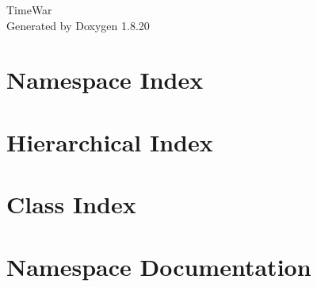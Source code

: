\let\mypdfximage\pdfximage\def\pdfximage{\immediate\mypdfximage}\documentclass[twoside]{book}
\newcommand{\+}{\discretionary{\mbox{\scriptsize$\hookleftarrow$}}{}{}}
\newcommand{\clearemptydoublepage}{%
  \newpage{\pagestyle{empty}\cleardoublepage}%
}
\begin{document}
\hypersetup{pageanchor=false,
             bookmarksnumbered=true,
             pdfencoding=unicode
            }
\begin{titlepage}
\vspace*{7cm}
\begin{center}%
{\Large Time\+War }\\
\vspace*{1cm}
{\large Generated by Doxygen 1.8.20}\\
\end{center}
\end{titlepage}
\clearemptydoublepage
{}
\tableofcontents
\clearemptydoublepage
{}
\hypersetup{pageanchor=true}

\chapter{Namespace Index}

\chapter{Hierarchical Index}

\chapter{Class Index}

\chapter{Namespace Documentation}



























\end{document}
